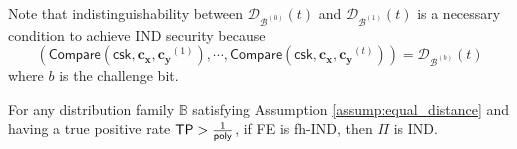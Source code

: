 Note that indistinguishability between $\mathcal{D}_{ \mathcal{B}^{(0)} }(t)$ and $\mathcal{D}_{ \mathcal{B}^{(1)} }(t)$ is a necessary condition to achieve IND security because
\[
	\left( \textsf{Compare}(\textsf{csk}, \mathbf{c_x}, \mathbf{c_y}^{(1)}), \cdots, \textsf{Compare}(\textsf{csk}, \mathbf{c_x}, \mathbf{c_y}^{(t)}) \right) = \mathcal{D}_{ \mathcal{B}^{(b)} }(t)
\]
where $b$ is the challenge bit.


\begin{theorem}
\label{thm:fh-IPFE:ind-ind}
For any distribution family $\mathbb{B}$ satisfying Assumption \ref{assump:equal_distance} and having a true positive rate $\textsf{TP} > \frac{1}{\mathsf{poly}}$, if \textsf{FE} is fh-IND, then $\Pi$ is IND.

\end{theorem}




